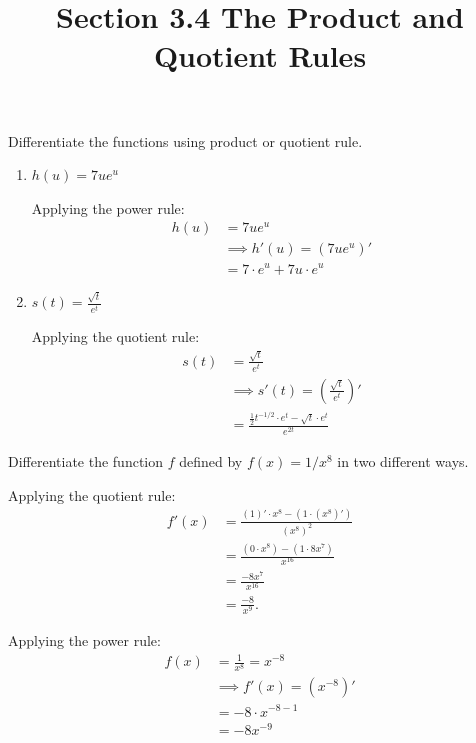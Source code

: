 \documentclass[nooutcomes,handout]{ximera}
\title{Section 3.4 The Product and Quotient Rules}
\begin{document}
\begin{abstract}		\end{abstract}
\maketitle


\begin{problem} Differentiate the functions using product or quotient rule.
\begin{enumerate}
	\item $h(u)=7ue^u$
	\begin{freeResponse}
 Applying the power rule:
  \begin{align*}
    h(u) &=7ue^u\\
    &\implies h'(u) = (7ue^u) '\\
    &= 7\cdot e^u+7u \cdot e^u
  \end{align*}
  \end{freeResponse}
	
	\item $s(t)=\frac{\sqrt{t}}{e^t}$
	\begin{freeResponse}
 Applying the quotient rule:
  \begin{align*}
    s(t)&=\frac{\sqrt{t}}{e^t}\\
    &\implies s'(t) = \left(\frac{\sqrt{t}}{e^t}\right)' \\
    &= \frac{\frac{1}{2}t^{-1/2} \cdot e^t -  \sqrt{t}\cdot e^t}{e^{2t}}
  \end{align*}
  \end{freeResponse}
\end{enumerate}
\end{problem}

\begin{problem}
 Differentiate the function $f$ defined by $f(x) = 1/x^8$ in two different ways.
  \begin{freeResponse}
    Applying the quotient rule:
    \begin{align*}
      f'(x) &= \frac{(1)' \cdot x^8 - (1 \cdot (x^8)')}{(x^8)^2} \\
            &= \frac{(0 \cdot x^8) - (1 \cdot 8x^7)}{x^{16}} \\
            &= \frac{-8x^7}{x^{16}}\\
            &= \frac{-8}{x^9}. 
    \end{align*}

  Applying the power rule:
  \begin{align*}
    f(x) &= \frac{1}{x^8} = x^{-8}\\
    &\implies f'(x) = (x^{-8})'\\
    &= -8\cdot x^{-8 -1}\\
    &= -8x^{-9}
  \end{align*}
  \end{freeResponse}
\end{problem}
	
\end{document}
